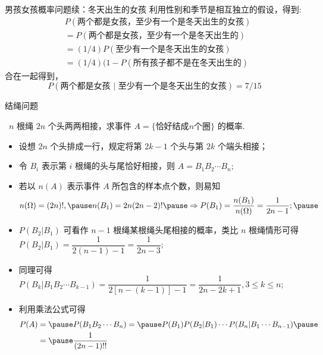 		\begin{frame}{男孩女孩概率问题续：冬天出生的女孩}
			利用性别和季节是相互独立的假设，得到:
        \begin{align*}
            &P (\mbox{两个都是女孩，至少有一个是冬天出生的女孩})\\
            &=P (\mbox{两个都是女孩，至少有一个是冬天出生的})\\
            &=(1/4) P (\mbox{至少有一个是冬天出生的女孩})\\
            &=(1/4) (1-P (\mbox{所有孩子都不是在冬天出生的})
        \end{align*}
        合在一起得到，$$P (\mbox{两个都是女孩 | 至少有一个是冬天出生的女孩})=7/15$$
\end{frame}


\begin{frame}{结绳问题}
	\vspace{-0.15cm}
	\begin{exam}\
		$n$ 根绳 $2n$ 个头两两相接，求事件 $A=\{\mbox{恰好结成} n\mbox{个圈}\}$ 的概率.
	\end{exam}
	\pause
	\vspace{-0.4cm}
	\begin{itemize}[<+-|alert@+>]
		\item 设想 $2n$ 个头排成一行，规定将第 $2k-1$ 个头与第 $2k$ 个端头相接；
		\item 令 $B_i$ 表示第 $i$ 根绳的头与尾恰好相接，则 $A=B_1B_2\cdots B_n$;
		\item 若以 $n (A)$ 表示事件 $A$ 所包含的样本点个数，则易知 \pause
		\begin{eqnarray*}
			n(\Omega)=(2n)!, \pause n(B_1)=2n(2n-2)!\pause \Rightarrow P(B_1)=\dfrac{n(B_1)}{n(\Omega)}=\dfrac{1}{2n-1};\pause
		\end{eqnarray*}
		\item $P (B_2|B_1)$ 可看作 $n-1$ 根绳某根绳头尾相接的概率，类比 $n$ 根绳情形可得 $P (B_2|B_1)=\dfrac{1}{2 (n-1)-1}=\dfrac{1}{2n-3};$
		\item 同理可得 $P (B_k|B_1B_2\cdots B_{k-1})=\dfrac{1}{2[n-(k-1)]-1}=\dfrac{1}{2n-2k+1}, 3\leq k\leq n;$
		\item 利用乘法公式可得
		\begin{align*}
			P(A)&=\pause P(B_1B_2\cdots B_n)=\pause P(B_1)P(B_2|B_1)\cdots P(B_n|B_1\cdots B_{n-1})\pause\\
			&=\pause\dfrac{1}{(2n-1)!!}
		\end{align*}
	\end{itemize}


\end{frame}


